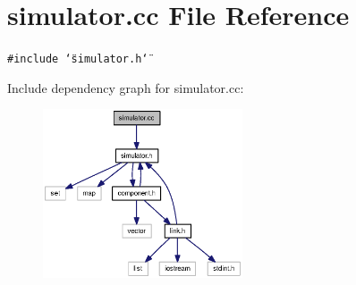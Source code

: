 \section{simulator.cc File Reference}
\label{simulator_8cc}
{\tt \#include \char`\"{}simulator.h\char`\"{}}\par


Include dependency graph for simulator.cc:\nopagebreak
\begin{figure}[H]
\begin{center}
\leavevmode
\includegraphics[width=167pt]{simulator_8cc__incl}
\end{center}
\end{figure}
